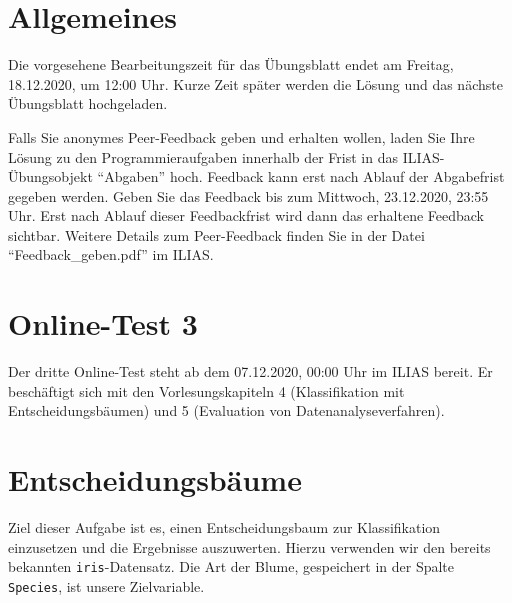 \documentclass[headinclude,headsepline]{scrartcl}
\newcommand{\code}[1]{{\color[HTML]{000080}\texttt{#1}}}
\begin{document}
\section*{Allgemeines}

Die vorgesehene Bearbeitungszeit für das Übungsblatt endet am Freitag, 18.12.2020, um 12:00 Uhr.
Kurze Zeit später werden die Lösung und das nächste Übungsblatt hochgeladen.

Falls Sie anonymes Peer-Feedback geben und erhalten wollen, laden Sie Ihre Lösung zu den Programmieraufgaben innerhalb der Frist in das ILIAS-Übungsobjekt ``Abgaben'' hoch.
Feedback kann erst nach Ablauf der Abgabefrist gegeben werden.
Geben Sie das Feedback bis zum Mittwoch, 23.12.2020, 23:55 Uhr.
Erst nach Ablauf dieser Feedbackfrist wird dann das erhaltene Feedback sichtbar.
Weitere Details zum Peer-Feedback finden Sie in der Datei ``Feedback\_geben.pdf'' im ILIAS.

\section{Online-Test 3}

Der dritte Online-Test steht ab dem 07.12.2020, 00:00 Uhr im ILIAS bereit.
Er beschäftigt sich mit den Vorlesungskapiteln 4 (Klassifikation mit Entscheidungsbäumen) und 5 (Evaluation von Datenanalyseverfahren).

\section{Entscheidungsbäume}

Ziel dieser Aufgabe ist es, einen Entscheidungsbaum zur Klassifikation einzusetzen und die Ergebnisse auszuwerten.
Hierzu verwenden wir den bereits bekannten \code{iris}-Datensatz.
Die Art der Blume, gespeichert in der Spalte \code{Species}, ist unsere Zielvariable.

\vspace{10pt}
\end{document}
